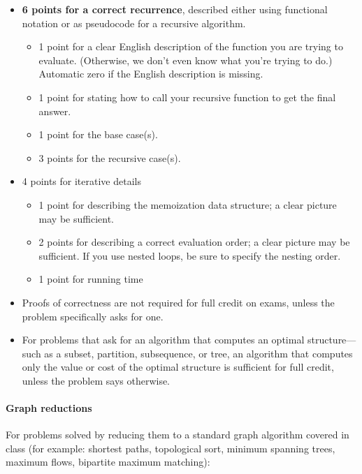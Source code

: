 \documentclass[12pt,answers,addpoints]{exam}
\begin{document}
\begin{itemize}
\item \textbf{6 points for a correct recurrence}, described either
  using functional notation or as pseudocode for a recursive
  algorithm.

  \begin{itemize}[label=+]
  \item 1 point for a clear English description of the function you
    are trying to evaluate.  (Otherwise, we don’t even know what
    you’re trying to do.) Automatic zero if the English description is
    missing.
  \item 1 point for stating how to call your recursive function to
    get the final answer.
  \item 1 point for the base case(s). 
  \item 3 points for the recursive case(s). 
  \end{itemize}
\item 4 points for iterative details

  \begin{itemize}[label=+]
  \item 1 point for describing the memoization data structure; a clear
    picture may be sufficient.
  \item 2 points for describing a correct evaluation order; a clear
    picture may be sufficient. If you use nested loops, be sure to
    specify the nesting order.
  \item 1 point for running time
  \end{itemize}
\item Proofs of correctness are not required for full credit on exams,
  unless the problem specifically asks for one.

\item For problems that ask for an algorithm that computes an optimal
  structure—such as a subset, partition, subsequence, or tree, an
  algorithm that computes only the value or cost of the optimal
  structure is sufficient for full credit, unless the problem says
  otherwise. 

\end{itemize}

\paragraph{Graph reductions}

For problems solved by reducing them to a standard graph algorithm
covered in class (for example: shortest paths, topological sort,
minimum spanning trees, maximum flows, bipartite maximum matching):
\end{document}
